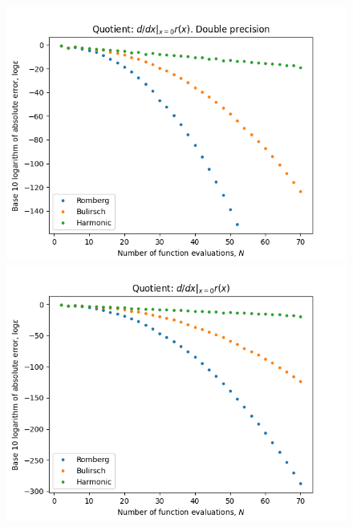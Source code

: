 \begin{figure}[H]
\centering
\begin{minipage}{0.45\textwidth}
\centering
\includegraphics[scale=0.45]{../results/diff_quot_plots/rho.png}
\end{minipage}
\begin{minipage}{0.45\textwidth}
\centering
\includegraphics[scale=0.45]{../results/diff_quot_plots/rho_hp.png}
\end{minipage}
\end{figure}

